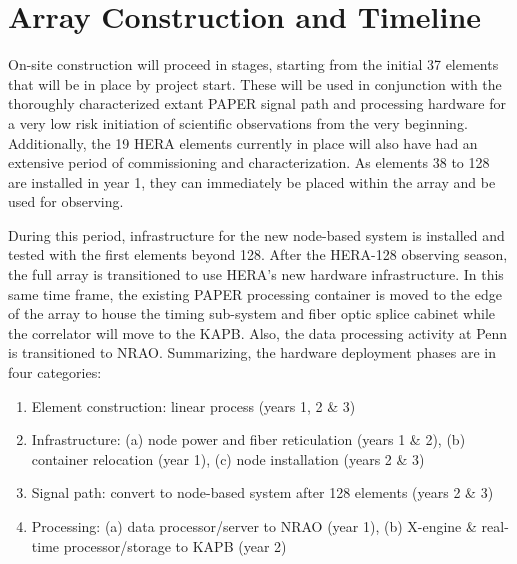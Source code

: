 \documentclass[preprint,11pt]{aastex}
\begin{document}

\vspace{-18pt}
\section{Array Construction and Timeline} \label{sec:timeline}
\vspace{-5pt}
\noindent On-site construction will proceed in stages, starting from the
initial 37 elements that will be in place by project start.  These will be used
in conjunction with the thoroughly characterized extant PAPER signal path and
processing hardware for a very low risk initiation of scientific observations
from the very beginning.  Additionally, the 19 HERA elements currently in
place will also have had an extensive period of commissioning
and characterization.  As elements 38 to 128 are installed in year 1, they can
immediately be placed within the array and be used for observing.

During this period, infrastructure for the new node-based system is installed
and tested with the first elements beyond 128.  After the HERA-128 observing
season, the full array is transitioned to use HERA's new hardware infrastructure.  In this same time frame, the existing PAPER processing
container is moved to the edge of the array to house the timing sub-system
and fiber optic splice cabinet while the correlator will move to the KAPB.
Also, the data processing activity at Penn is transitioned to NRAO.
Summarizing, the hardware deployment phases are in four categories:
\begin{enumerate}
\item Element construction:  linear process (years 1, 2 \& 3)
\item Infrastructure:  (a) node power and fiber reticulation (years 1 \& 2), (b) container relocation (year 1), (c) node installation (years 2 \& 3)
\item Signal path:  convert to node-based system after 128 elements (years 2 \& 3)
\item Processing:  (a) data processor/server to NRAO (year 1), (b) X-engine \& real-time processor/storage to KAPB (year 2)
\end{enumerate}
\end{document}
